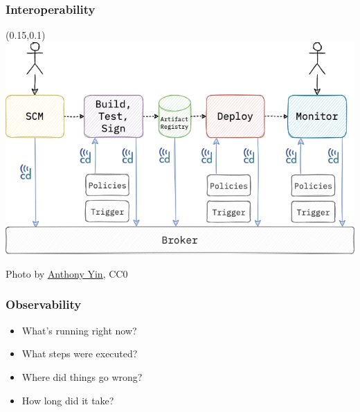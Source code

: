 \documentclass[aspectratio=169,11pt,hyperref={colorlinks=true}]{beamer}
\begin{document}
\begin{grayframe}
  \frametitle{Interoperability}
  \begin{textblock*}{0.70\paperwidth}(0.15\paperwidth,0.1\paperheight)
    \includegraphics[width=0.70\paperwidth]{img/cdevents-3-events.png}
  \end{textblock*}
\end{grayframe}

\begin{textondarkpic}{%
  Photo by \href{https://unsplash.com/@anthonyin}{\underline{Anthony Yin}}, CC0
  }%
  \frametitle{Observability}
  \begin{itemize}
    \item What's running right now?
    \item What steps were executed?
    \item Where did things go wrong?
    \item How long did it take?
  \end{itemize}
\end{textondarkpic}
\end{document}
